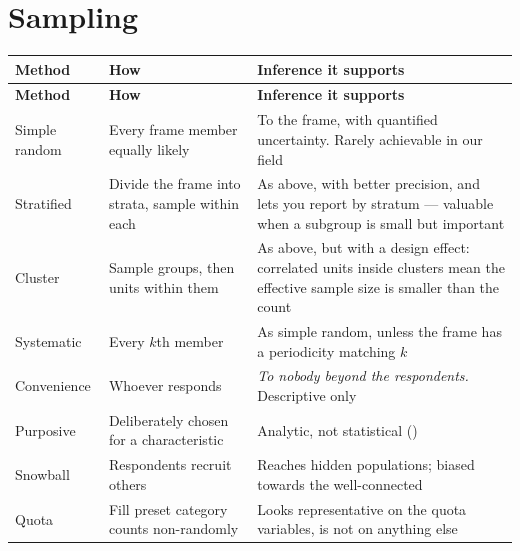 \section{Sampling}

\begin{center}
\small
\begin{longtable}{@{}L{2.9cm}L{5.0cm}L{6.2cm}@{}}
\toprule
\textbf{Method} & \textbf{How} & \textbf{Inference it supports} \\
\midrule
\endfirsthead
\toprule
\textbf{Method} & \textbf{How} & \textbf{Inference it supports} \\
\midrule
\endhead
\bottomrule
\endfoot
Simple random
  & Every frame member equally likely
  & To the frame, with quantified uncertainty. Rarely achievable in our field \\
Stratified
  & Divide the frame into strata, sample within each
  & As above, with better precision, and lets you report by stratum ---
    valuable when a subgroup is small but important \\
Cluster
  & Sample groups, then units within them
  & As above, but with a design effect: correlated units inside clusters mean
    the effective sample size is smaller than the count \\
Systematic
  & Every $k$th member
  & As simple random, unless the frame has a periodicity matching $k$ \\
\midrule
Convenience
  & Whoever responds
  & \emph{To nobody beyond the respondents.} Descriptive only \\
Purposive
  & Deliberately chosen for a characteristic
  & Analytic, not statistical () \\
Snowball
  & Respondents recruit others
  & Reaches hidden populations; biased towards the well-connected \\
Quota
  & Fill preset category counts non-randomly
  & Looks representative on the quota variables, is not on anything else \\
\end{longtable}
\end{center}

